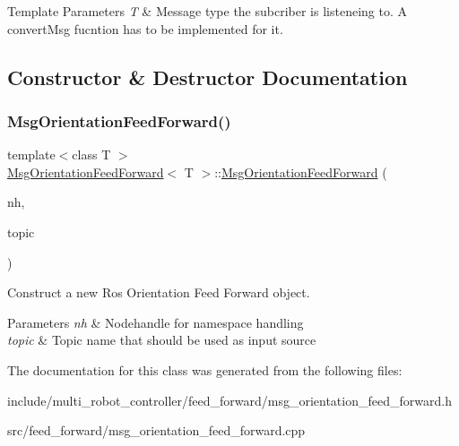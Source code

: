 \begin{DoxyTemplParams}{Template Parameters}
{\em T} & Message type the subcriber is listeneing to. A convert\+Msg fucntion has to be implemented for it. \\
\hline
\end{DoxyTemplParams}


\subsection{Constructor \& Destructor Documentation}
\mbox{\label{classMsgOrientationFeedForward_a487a69133c5098f14abeeeefe76306d1}} 
\subsubsection{\texorpdfstring{Msg\+Orientation\+Feed\+Forward()}{MsgOrientationFeedForward()}}
{\footnotesize\ttfamily template$<$class T $>$ \\
\hyperlink{classMsgOrientationFeedForward}{Msg\+Orientation\+Feed\+Forward}$<$ T $>$\+::\hyperlink{classMsgOrientationFeedForward}{Msg\+Orientation\+Feed\+Forward} (\begin{DoxyParamCaption}\item[{ros\+::\+Node\+Handle \&}]{nh,  }\item[{std\+::string}]{topic }\end{DoxyParamCaption})}



Construct a new Ros Orientation Feed Forward object. 


\begin{DoxyParams}{Parameters}
{\em nh} & Nodehandle for namespace handling \\
\hline
{\em topic} & Topic name that should be used as input source \\
\hline
\end{DoxyParams}


The documentation for this class was generated from the following files\+:\begin{DoxyCompactItemize}
\item 
include/multi\+\_\+robot\+\_\+controller/feed\+\_\+forward/msg\+\_\+orientation\+\_\+feed\+\_\+forward.\+h\item 
src/feed\+\_\+forward/msg\+\_\+orientation\+\_\+feed\+\_\+forward.\+cpp\end{DoxyCompactItemize}

